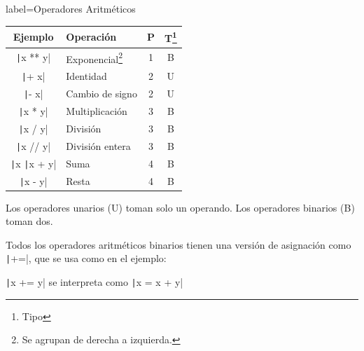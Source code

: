 \begin{contentbox}{label=Operadores Aritméticos}
    \begin{center}
        \begin{tabular}{C|l|c|c}
            \textnormal{Ejemplo} & Operación & P & T\footnote{Tipo}\\
            \hline
            \texttt|x ** y| & Exponencial\footnote{Se agrupan de derecha a izquierda.} & 1 & B \\
            \hline
            \texttt|+ x| & Identidad & 2 & U \\
            \texttt|- x| & Cambio de signo & 2 & U \\
            \hline
            \texttt|x * y| & Multiplicación & 3 & B\\
            \texttt|x / y| & División & 3 & B \\
            \texttt|x // y| & División entera & 3 & B \\
            \texttt|x %
            \hline 
            \texttt|x + y| & Suma & 4 & B \\
            \texttt|x - y| & Resta & 4 & B \\
            \hline
        \end{tabular}
    \end{center}
    
    Los operadores \alert{unarios} (U) toman solo un operando. Los operadores \alert{binarios} (B) toman dos.
    
    Todos los operadores aritméticos binarios tienen una versión de asignación como \texttt|+=|, que se usa como en el ejemplo:
    \begin{center}
        \texttt|x += y| se interpreta como \texttt|x = x + y|
    \end{center}
\end{contentbox}

